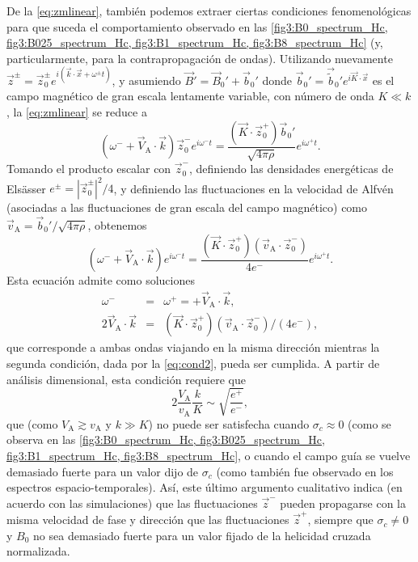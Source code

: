 De la \cref{eq:zmlinear}, también podemos extraer ciertas condiciones
fenomenológicas para que suceda el comportamiento observado en las
\cref{fig3:B0_spectrum_Hc, fig3:B025_spectrum_Hc, fig3:B1_spectrum_Hc,
  fig3:B8_spectrum_Hc} (y, particularmente, para la contrapropagación
de ondas). Utilizando nuevamente $\vec{z}^\pm = \vec{z}_0^\pm
e^{i(\vec{k}\cdot \vec{x}+\omega^\pm t)}$, y asumiendo $\vec{B}' =
\vec{B}_0' + \vec{b}_0'$ donde $\vec{b}_0' =
\vec{\tilde{b}}_0'e^{i\vec{K} \cdot \vec{x}}$ es el campo magnético de
gran escala lentamente variable, con número de onda $K \ll k$, la
\cref{eq:zmlinear} se reduce a
\begin{equation}
\left( \omega^- +\vec{V}_\textrm{A} \cdot \vec{k} \right) 
    \vec{z}_0^- e^{i \omega^- t} = 
    \frac{\left(\vec{K} \cdot \vec{z}_0^+\right) \vec{b}_0'}{\sqrt{4\pi \rho}} 
    e^{i \omega^+ t} .
\end{equation}
Tomando el producto escalar con $\vec{z}_0^-$, definiendo las
densidades energéticas de Els\"asser $e^\pm = |\vec{z}_0^\pm|^2/4$, y
definiendo las fluctuaciones en la velocidad de Alfvén (asociadas a
las fluctuaciones de gran escala del campo magnético) como
$\vec{v}_\textrm{A} = \vec{b}_0'/\sqrt{4\pi \rho}$, obtenemos
\begin{equation}
\left( \omega^- + \vec{V}_\textrm{A} \cdot \vec{k} \right)
    e^{i \omega^- t} = 
    \frac{\left(\vec{K} \cdot \vec{z}_0^+\right)
    \left(\vec{v}_\textrm{A} \cdot \vec{z}_0^-\right)}
    {4e^-} 
    e^{i \omega^+ t} .
\end{equation}
Esta ecuación admite como soluciones
\begin{eqnarray}
    \omega^- &=& \omega^+ =
    + \vec{V}_\textrm{A} \cdot \vec{k}, 
    \label{eq:cond1} \\
    2 \vec{V}_\textrm{A} \cdot \vec{k} &=& 
    \left(\vec{K} \cdot \vec{z}_0^+\right)
    \left(\vec{v}_\textrm{A} \cdot \vec{z}_0^-\right) /
    (4e^-), \label{eq:cond2}
\end{eqnarray}
que corresponde a ambas ondas viajando en la misma dirección mientras
la segunda condición, dada por la \cref{eq:cond2}, pueda ser
cumplida. A partir de análisis dimensional, esta condición requiere
que
\begin{equation}
    2 \frac{V_\textrm{A}}{v_\textrm{A}} \frac{k}{K}
    \sim \sqrt{\frac{e^+}{e^-}},
\end{equation}
que (como $V_\textrm{A}\gtrsim v_\textrm{A}$ y $k\gg K$) no puede ser
satisfecha cuando $\sigma_c \approx 0$ (como se observa en las
\cref{fig3:B0_spectrum_Hc, fig3:B025_spectrum_Hc, fig3:B1_spectrum_Hc,
  fig3:B8_spectrum_Hc}, o cuando el campo guía se vuelve demasiado
fuerte para un valor dijo de $\sigma_c$ (como también fue observado en
los espectros espacio-temporales). Así, este último argumento
cualitativo indica (en acuerdo con las simulaciones) que las
fluctuaciones $\vec{z}^-$ pueden propagarse con la misma velocidad de
fase y dirección que las fluctuaciones $\vec{z}^+$, siempre que
$\sigma_c \neq 0$ y $B_0$ no sea demasiado fuerte para un valor fijado
de la helicidad cruzada normalizada.

